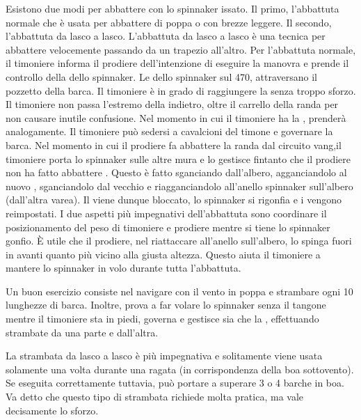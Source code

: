 Esistono due modi per abbattere con lo spinnaker issato. Il primo, l'abbattuta
normale che è usata per abbattere di poppa o con brezze leggere. Il secondo,
l'abbattuta da lasco a lasco. L'abbattuta da lasco a lasco è una tecnica per
abbattere velocemente passando da un trapezio all'altro.
%
Per l'abbattuta normale, il timoniere informa il prodiere dell'intenzione di
eseguire la manovra e prende il controllo della \sheet dello spinnaker. Le
\sheets dello spinnaker sul 470, attraversano il pozzetto della barca. Il
timoniere è in grado di raggiungere la \sheet senza troppo sforzo. Il timoniere
non passa l'estremo della \sheet indietro, oltre il carrello della randa per non
causare inutile confusione. Nel momento in cui il timoniere ha la \sheet,
prenderà \theguy analogamente. Il timoniere può sedersi a cavalcioni del timone
e governare la barca. Nel momento in cui il prodiere fa abbattere la randa dal
circuito vang,il timoniere porta lo spinnaker sulle altre mura e lo gestisce
fintanto che il prodiere non ha fatto abbattere \thepole.
%
Questo è fatto sganciando \thepole dall'albero, agganciandolo al nuovo \guy,
sganciandolo dal vecchio \guy e riagganciandolo all'anello spinnaker sull'albero
(dall'altra varea). Il \guy viene dunque bloccato, lo spinnaker si rigonfia e i
\twinglines vengono reimpostati. I due aspetti più impegnativi dell'abbattuta
sono coordinare il posizionamento del peso di timoniere e prodiere mentre si
tiene lo spinnaker gonfio. È utile che il prodiere, nel riattaccare \thepole
all'anello sull'albero, lo spinga fuori in avanti quanto più vicino alla giusta
altezza. Questo aiuta il timoniere a mantere lo spinnaker in volo durante tutta
l'abbattuta.

Un buon esercizio consiste nel navigare con il vento in poppa e strambare ogni
10 lunghezze di barca. Inoltre, prova a far volare lo spinnaker senza il tangone
mentre il timoniere sta in piedi, governa e gestisce sia \theguy che la
\sheet, effettuando strambate da una parte e dall'altra.

La strambata da lasco a lasco è più impegnativa e solitamente viene usata
solamente una volta durante una ragata (in corrispondenza della boa sottovento).
Se eseguita correttamente tuttavia, può portare a superare 3 o 4 barche in boa.
Va detto che questo tipo di strambata richiede molta pratica, ma vale
decisamente lo sforzo.

